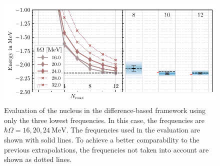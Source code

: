 \begin{figure}[H]
  \centering
  \includegraphics{media/outlook_selection.pdf}
  \caption{Evaluation of the  nucleus in the difference-based framework using only the three lowest frequencies. In this case, the frequencies are $\hbar\Omega = 16, 20, \SI{24}{\mega\electronvolt}$. The frequencies used in the evaluation are shown with solid lines. To achieve a better comparability to the previous extrapolations, the frequencies not taken into account are shown as dotted lines.}
  \label{fig:eval_freqselection}
\end{figure}
